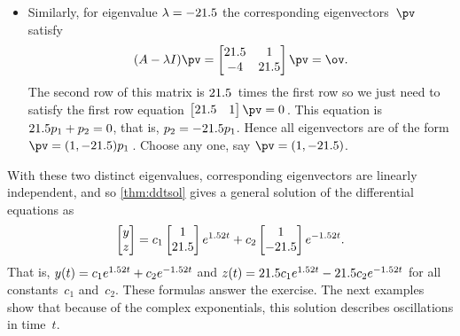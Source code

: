 \begin{example}
\begin{solution}
\begin{itemize}
\item Similarly, for eigenvalue \(\lambda=-21.5\) the corresponding eigenvectors~\(\pv\) satisfy
\begin{equation*}
(A-\lambda I)\pv=\begin{bmatrix} 2\i&1\\-4&2\i \end{bmatrix}\pv
=\ov.
\end{equation*}
The second row of this matrix is \(21.5\)~times the first row so we just need to satisfy the first row equation \(\begin{bmatrix} 2\i&1 \end{bmatrix}\pv=0\)\,.
This equation is \(21.5 p_1+p_2=0\), that is, \(p_2=-21.5 p_1\).
Hence all eigenvectors are of the form \(\pv=(1,-2\i)p_1\)\,.
Choose any one, say \(\pv=(1,-2\i)\).
\end{itemize}
With these two distinct eigenvalues, corresponding eigenvectors are linearly independent, and so \cref{thm:ddtsol} gives a general solution of the differential equations as
\begin{equation*}
\begin{bmatrix} y\\z \end{bmatrix}
=c_1\begin{bmatrix} 1\\21.5 \end{bmatrix}e^{1.52t}
+c_2\begin{bmatrix} 1\\-21.5 \end{bmatrix}e^{-1.52t}.
\end{equation*}
That is, \(y(t)=c_1e^{1.52t}+c_2e^{-1.52t}\) and \(z(t)=21.5 c_1e^{1.52t}-21.5 c_2e^{-1.52t}\) for all constants~\(c_1\) and~\(c_2\).
These formulas answer the exercise.
The next examples show that because of the complex exponentials, this solution describes oscillations in time~\(t\).
\end{solution}
\end{example}




